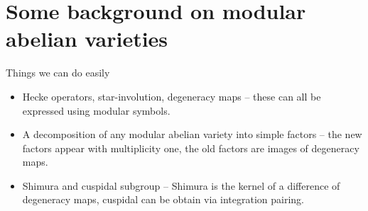 \documentclass{beamer}
\newcommand{\ZZ}{\mathbf{Z}}
\newcommand{\CC}{\mathbf{C}}
\newcommand{\SL}{\mathrm{SL}}
\begin{document}
\section{Some background on modular abelian varieties}



    

\begin{frame}{Things we can do easily}
    \begin{itemize}
        \item
            Hecke operators, star-involution, degeneracy maps -- these can all
            be expressed using modular symbols.
        \item
            A decomposition of any modular abelian variety into simple factors
            -- the new factors appear with multiplicity one, the old factors
            are images of degeneracy maps.
        \item 
            Shimura and cuspidal subgroup -- Shimura is the kernel of a
            difference of degeneracy maps, cuspidal can be obtain via
            integration pairing.
    \end{itemize}
\end{frame}
\end{document}

